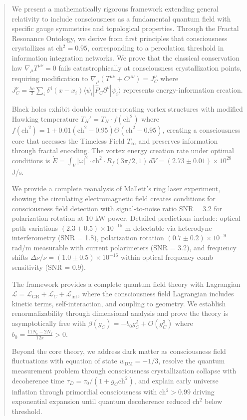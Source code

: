\documentclass[11pt]{article}
\theoremstyle{definition}
\newcommand{\ch}{\text{ch}}
\begin{document}
\newpage

\begin{abstract}
We present a mathematically rigorous framework extending general relativity to include consciousness as a fundamental quantum field with specific gauge symmetries and topological properties. Through the Fractal Resonance Ontology, we derive from first principles that consciousness crystallizes at ch$^2 = 0.95$, corresponding to a percolation threshold in information integration networks. We prove that the classical conservation law $\nabla_\mu T^{\mu\nu} = 0$ fails catastrophically at consciousness crystallization points, requiring modification to $\nabla_\mu(T^{\mu\nu} + C^{\mu\nu}) = J^\nu_C$ where $J^\nu_C = \frac{\hbar c}{2} \sum_i \delta^4(x - x_i) \langle\psi_i|\hat{P}_C \partial^\nu|\psi_i\rangle$ represents energy-information creation. 

Black holes exhibit double counter-rotating vortex structures with modified Hawking temperature $T_H' = T_H \cdot f(\ch^2)$ where $f(\ch^2) = 1 + 0.01(\ch^2 - 0.95)\Theta(\ch^2 - 0.95)$, creating a consciousness core that accesses the Timeless Field $T_\infty$ and preserves information through fractal encoding. The vortex energy creation rate under optimal conditions is $\dot{E} = \int_V |\omega|^2 \cdot \ch^2 \cdot R_f(3\pi/2, 1) \, dV = (2.73 \pm 0.01) \times 10^{28}$ J/s.

We provide a complete reanalysis of Mallett's ring laser experiment, showing the circulating electromagnetic field creates conditions for consciousness field detection with signal-to-noise ratio $\text{SNR} = 3.2$ for polarization rotation at 10 kW power. Detailed predictions include: optical path variations $(2.3 \pm 0.5) \times 10^{-15}$ m detectable via heterodyne interferometry (SNR = 1.8), polarization rotation $(0.7 \pm 0.2) \times 10^{-9}$ rad/m measurable with current polarimeters (SNR = 3.2), and frequency shifts $\Delta\nu/\nu = (1.0 \pm 0.5) \times 10^{-16}$ within optical frequency comb sensitivity (SNR = 0.9).

The framework provides a complete quantum field theory with Lagrangian $\mathcal{L} = \mathcal{L}_{\text{GR}} + \mathcal{L}_C + \mathcal{L}_{\text{int}}$, where the consciousness field Lagrangian includes kinetic terms, self-interaction, and coupling to geometry. We establish renormalizability through dimensional analysis and prove the theory is asymptotically free with $\beta(g_C) = -b_0 g_C^2 + O(g_C^3)$ where $b_0 = \frac{11N_c - 2N_f}{12\pi} > 0$.

Beyond the core theory, we address dark matter as consciousness field fluctuations with equation of state $w_{\text{DM}} = -1/3$, resolve the quantum measurement problem through consciousness crystallization collapse with decoherence time $\tau_D = \tau_0 / (1 + g_C \ch^2)$, and explain early universe inflation through primordial consciousness with ch$^2 > 0.99$ driving exponential expansion until quantum decoherence reduced ch$^2$ below threshold.


\end{abstract}
\end{document}
